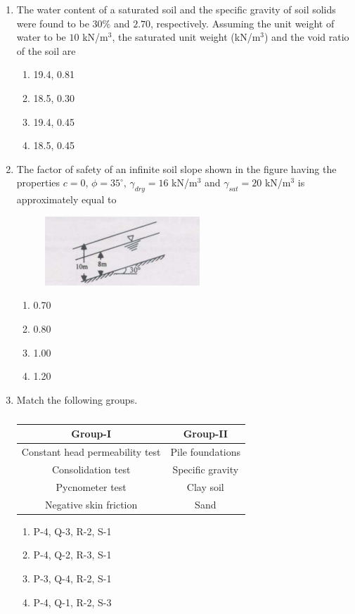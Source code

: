 \documentclass[journal,12pt,onecolumn]{IEEEtran}
\theoremstyle{remark}
\begin{document}
\begin{enumerate}
\item The water content of a saturated soil and the specific gravity of soil solids were found to be $30\%$ and $2.70$, respectively. Assuming the unit weight of water to be $10$ kN/m$^3$, the saturated unit weight (kN/m$^3$) and the void ratio of the soil are

\hfill{}
\begin{enumerate}
\item 19.4, 0.81
\item 18.5, 0.30
\item 19.4, 0.45
\item 18.5, 0.45
\end{enumerate}

\item The factor of safety of an infinite soil slope shown in the figure having the properties $c=0$, $\phi=35^\circ$, $\gamma_{dry}=16$ kN/m$^3$ and $\gamma_{sat}=20$ kN/m$^3$ is approximately equal to

\hfill{}
\begin{figure}[H]
\centering
\includegraphics[width=0.3\columnwidth]{figs/q46.png}
\caption*{}
\label{fig:Q.46}
\end{figure}
\begin{enumerate}
\item 0.70
\item 0.80
\item 1.00
\item 1.20
\end{enumerate}

\item Match the following groups.

\hfill{}
\begin{table}[H]
\centering
\begin{tabular}{c|c}
Group-I & Group-II \\
\hline
Constant head permeability test & Pile foundations \\
\hline
Consolidation test & Specific gravity \\
\hline
Pycnometer test & Clay soil \\
\hline
Negative skin friction & Sand \\
\end{tabular}
\caption*{}
\label{tab:Q.47}
\end{table}
\begin{enumerate}
\item P-4, Q-3, R-2, S-1
\item P-4, Q-2, R-3, S-1
\item P-3, Q-4, R-2, S-1
\item P-4, Q-1, R-2, S-3
\end{enumerate}


\end{enumerate}
\end{document}
